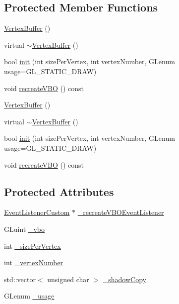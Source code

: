 \subsection*{Protected Member Functions}
\begin{DoxyCompactItemize}
\item 
\hyperlink{classVertexBuffer_adb25d82a47ad82d5b69a75ac111401b8}{Vertex\+Buffer} ()
\item 
virtual \hyperlink{classVertexBuffer_a5216726fdd43b2ae8e1439e347717fdd}{$\sim$\+Vertex\+Buffer} ()
\item 
bool \hyperlink{classVertexBuffer_a5efdc0f2c65d22b6ea20c89938ac7ff6}{init} (int size\+Per\+Vertex, int vertex\+Number, G\+Lenum usage=G\+L\+\_\+\+S\+T\+A\+T\+I\+C\+\_\+\+D\+R\+AW)
\item 
void \hyperlink{classVertexBuffer_afac40219f059942be1fca86138205dbf}{recreate\+V\+BO} () const
\item 
\hyperlink{classVertexBuffer_adb25d82a47ad82d5b69a75ac111401b8}{Vertex\+Buffer} ()
\item 
virtual \hyperlink{classVertexBuffer_a0ce3e9efa25da1efb9e80d19dbf1503f}{$\sim$\+Vertex\+Buffer} ()
\item 
bool \hyperlink{classVertexBuffer_a5efdc0f2c65d22b6ea20c89938ac7ff6}{init} (int size\+Per\+Vertex, int vertex\+Number, G\+Lenum usage=G\+L\+\_\+\+S\+T\+A\+T\+I\+C\+\_\+\+D\+R\+AW)
\item 
void \hyperlink{classVertexBuffer_afac40219f059942be1fca86138205dbf}{recreate\+V\+BO} () const
\end{DoxyCompactItemize}
\subsection*{Protected Attributes}
\begin{DoxyCompactItemize}
\item 
\hyperlink{classEventListenerCustom}{Event\+Listener\+Custom} $\ast$ \hyperlink{classVertexBuffer_a2b8b4f3aa37756390052337a35241c1a}{\+\_\+recreate\+V\+B\+O\+Event\+Listener}
\item 
G\+Luint \hyperlink{classVertexBuffer_a7dcce3c5252f7cee70fa64020579f5a0}{\+\_\+vbo}
\item 
int \hyperlink{classVertexBuffer_ab05f6c9eff8170979481a65bfe7a3112}{\+\_\+size\+Per\+Vertex}
\item 
int \hyperlink{classVertexBuffer_a1893c2dafea7923f7e5a508154ffd597}{\+\_\+vertex\+Number}
\item 
std\+::vector$<$ unsigned char $>$ \hyperlink{classVertexBuffer_adeb3cdd849a4ae297cef44aa72711cc8}{\+\_\+shadow\+Copy}
\item 
G\+Lenum \hyperlink{classVertexBuffer_afc2e5896bd99325f5da9203a9d9437a5}{\+\_\+usage}
\end{DoxyCompactItemize}
